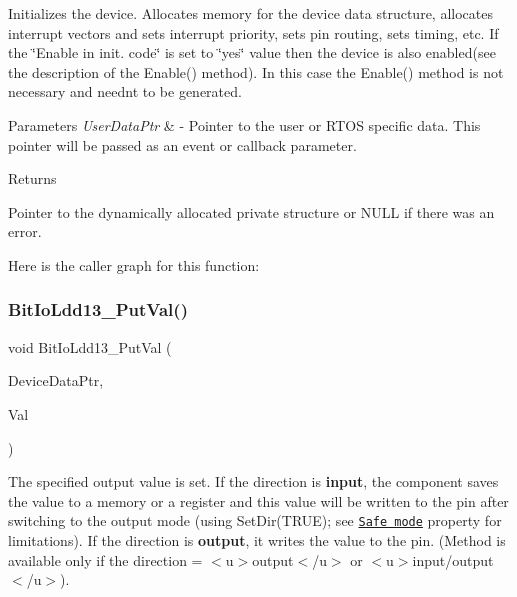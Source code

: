 Initializes the device. Allocates memory for the device data structure, allocates interrupt vectors and sets interrupt priority, sets pin routing, sets timing, etc. If the \char`\"{}\+Enable
    in init. code\char`\"{} is set to \char`\"{}yes\char`\"{} value then the device is also enabled(see the description of the Enable() method). In this case the Enable() method is not necessary and needn\textquotesingle{}t to be generated. 


\begin{DoxyParams}{Parameters}
{\em User\+Data\+Ptr} & -\/ Pointer to the user or R\+T\+OS specific data. This pointer will be passed as an event or callback parameter. \\
\hline
\end{DoxyParams}
\begin{DoxyReturn}{Returns}

\begin{DoxyItemize}
\item Pointer to the dynamically allocated private structure or N\+U\+LL if there was an error. 
\end{DoxyItemize}
\end{DoxyReturn}
Here is the caller graph for this function\+:
\mbox{\label{group___bit_io_ldd13__module_ga9e36ef0c8392418090d73328ba1b1d72}} 
\subsubsection{\texorpdfstring{Bit\+Io\+Ldd13\+\_\+\+Put\+Val()}{BitIoLdd13\_PutVal()}}
{\footnotesize\ttfamily void Bit\+Io\+Ldd13\+\_\+\+Put\+Val (\begin{DoxyParamCaption}\item[{\hyperlink{group___p_e___types__module_gac5cf1362f1f0e3a2ce71b1bf2276d091}{L\+D\+D\+\_\+\+T\+Device\+Data} $\ast$}]{Device\+Data\+Ptr,  }\item[{\hyperlink{group___p_e___types__module_ga97a80ca1602ebf2303258971a2c938e2}{bool}}]{Val }\end{DoxyParamCaption})}



The specified output value is set. If the direction is {\bfseries  input}, the component saves the value to a memory or a register and this value will be written to the pin after switching to the output mode (using {\ttfamily Set\+Dir(\+T\+R\+U\+E)}; see \href{BitIOProperties.html#SafeMode}{\tt Safe mode} property for limitations). If the direction is {\bfseries output}, it writes the value to the pin. (Method is available only if the direction = $<$u$>${\ttfamily output}$<$/u$>$ or $<$u$>${\ttfamily  input/output}$<$/u$>$). 


